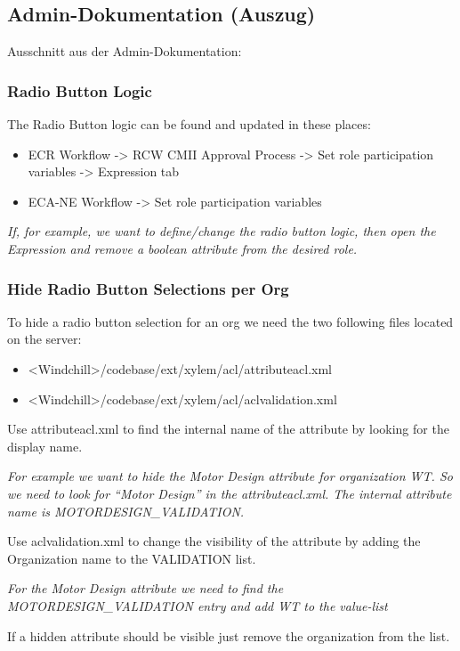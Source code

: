 \subsection{Admin-Dokumentation (Auszug)}
\label{app:AdminDokumentation}
Ausschnitt aus der Admin-Dokumentation:

\subsubsection*{Radio Button Logic}
The Radio Button logic can be found and updated in these places:
\begin{itemize}
    \item ECR Workflow -> RCW CMII Approval Process -> Set role participation variables -> Expression tab
    \item ECA-NE Workflow -> Set role participation variables
\end{itemize}
\textit{If, for example, we want to define/change the radio button logic, then open the Expression and remove a boolean attribute from the desired role.}

\subsubsection*{Hide Radio Button Selections per Org}
To hide a radio button selection for an org we need the two following files located on the server:
\begin{itemize}
    \item <Windchill>/codebase/ext/xylem/acl/attributeacl.xml
    \item <Windchill>/codebase/ext/xylem/acl/aclvalidation.xml
\end{itemize}
Use attributeacl.xml to find the internal name of the attribute by looking for the display name.

\textit{For example we want to hide the Motor Design attribute for organization WT. So we need to look for “Motor Design” in the attributeacl.xml. The internal attribute name is MOTORDESIGN\_VALIDATION.}

Use aclvalidation.xml to change the visibility of the attribute by adding the Organization name to the VALIDATION list.

\textit{For the Motor Design attribute we need to find the MOTORDESIGN\_VALIDATION entry and add WT to the value-list}

If a hidden attribute should be visible just remove the organization from the list.

